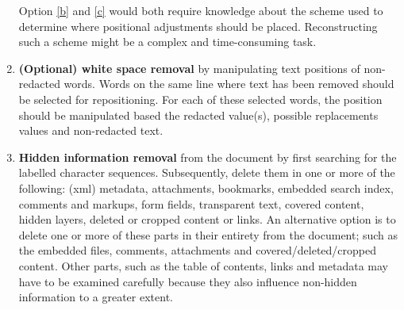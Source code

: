 \begin{enumerate}
        Option \ref{b} and \ref{c} would both require knowledge about the scheme used to determine where positional adjustments should be placed. Reconstructing such a scheme might be a complex and time-consuming task. 
    \item \textbf{(Optional) white space removal} by manipulating text positions of non-redacted words. Words on the same line where text has been removed should be selected for repositioning. For each of these selected words, the position should be manipulated based the redacted value(s), possible replacements values and non-redacted text.
    \item \textbf{Hidden information removal} from the document by first searching for the labelled character sequences. Subsequently, delete them in one or more of the following: (xml) metadata, attachments, bookmarks, embedded search index, comments and markups, form fields, transparent text, covered content, hidden layers, deleted or cropped content or links. An alternative option is to delete one or more of these parts in their entirety from the document; such as the embedded files, comments, attachments and covered/deleted/cropped content. Other parts, such as the table of contents, links and metadata may have to be examined carefully because they also influence non-hidden information to a greater extent. 

\end{enumerate}

